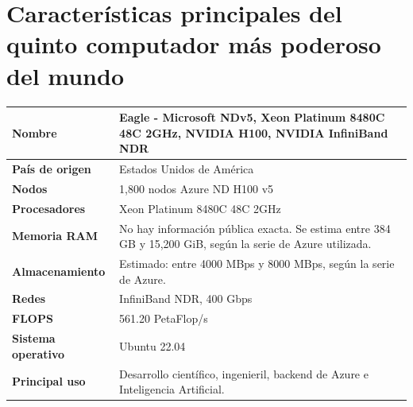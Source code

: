 \section{Características principales del quinto computador más poderoso del mundo}

\begin{tabularx}{\textwidth}{>{\bfseries}l X}
\toprule
Nombre & Eagle - Microsoft NDv5, Xeon Platinum 8480C 48C 2GHz, NVIDIA H100, NVIDIA InfiniBand NDR \\
\midrule
País de origen & Estados Unidos de América \\
Nodos & 1,800 nodos Azure ND H100 v5 \\
Procesadores & Xeon Platinum 8480C 48C 2GHz \\
Memoria RAM & No hay información pública exacta. Se estima entre 384 GB y 15,200 GiB, según la serie de Azure utilizada. \\
Almacenamiento & Estimado: entre 4000 MBps y 8000 MBps, según la serie de Azure. \\
Redes & InfiniBand NDR, 400 Gbps \\
FLOPS & 561.20 PetaFlop/s \\
Sistema operativo & Ubuntu 22.04 \\
Principal uso & Desarrollo científico, ingenieril, backend de Azure e Inteligencia Artificial. \\
\bottomrule
\end{tabularx}
